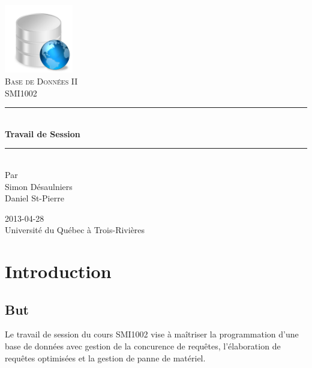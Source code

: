 \documentclass[11pt,french]{article}
\newcommand{\HRule}{\rule{\linewidth}{0.5mm}}
\begin{document}
    \begin{titlepage}
        \begin{center}
    
            \includegraphics[height=3cm]{./aux/bd1.png}
            \\[3cm]
            
            \textsc{\LARGE Base de Données II}
            \\[0.2cm]
            \textsc{\Large SMI1002}
            \\[2cm]
            \HRule \\[0.5cm]
            {\huge \bfseries Travail de Session}
            \HRule \\[2cm]
            Par\\
            Simon Désaulniers\\
            Daniel St-Pierre

            \vfill
            2013-04-28\\
            Université du Québec à Trois-Rivières
            \thispagestyle{empty}
        \end{center}
    \end{titlepage}
    \newpage
    
    \setcounter{page}{1}
    \tableofcontents
    \newpage

    \setcounter{page}{1}

    \section*{Introduction} %
    \label{sec:Introduction}
        \subsection*{But} %
        \label{sub:but}
            Le travail de session du cours SMI1002 vise à maîtriser la programmation d'une base
            de données avec gestion de la concurence de requêtes, l'élaboration de requêtes optimisées
            et la gestion de panne de matériel.
\end{document}
